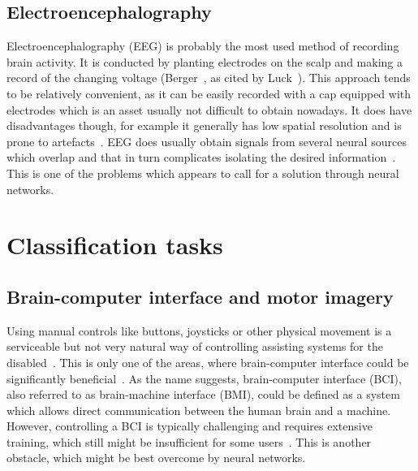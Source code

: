 \documentclass[english,BP]{thesiskiv}
\begin{document}
	\subsection{Electroencephalography}

	Electroencephalography (EEG) is probably the most used method of recording brain activity. It is conducted by planting electrodes on the scalp and making a record of the changing voltage (Berger~\cite{berger:eeg:29}, as cited by Luck~\cite{luck:erp:book}). This approach tends to be relatively convenient, as it can be easily recorded with a cap equipped with electrodes which is an asset usually not difficult to obtain nowadays.
	It does have disadvantages though, for example it generally has low spatial resolution and is prone to artefacts~\cite{berezutskaya:ieeg:22}. EEG does usually obtain signals from several neural sources which overlap and that in turn complicates isolating the desired information~\cite{luck:erp:book}. This is one of the problems which appears to call for a solution through neural networks.


	\section{Classification tasks}

	\subsection{Brain-computer interface and motor imagery}

	Using manual controls like buttons, joysticks or other physical movement is a serviceable but not very natural way of controlling assisting systems for the disabled~\cite{he:bci:legs:18}. This is only one of the areas, where brain-computer interface could be significantly beneficial~\cite{craik:dl:eeg:rev:19}.
	As the name suggests, brain-computer interface (BCI), also referred to as brain-machine interface (BMI), could be defined as a system which allows direct communication between the human brain and a machine. However, controlling a BCI is typically challenging and requires extensive training, which still might be insufficient for some users~\cite{stieger:data:21}. 
	This is another obstacle, which might be best overcome by neural networks.
\end{document}
